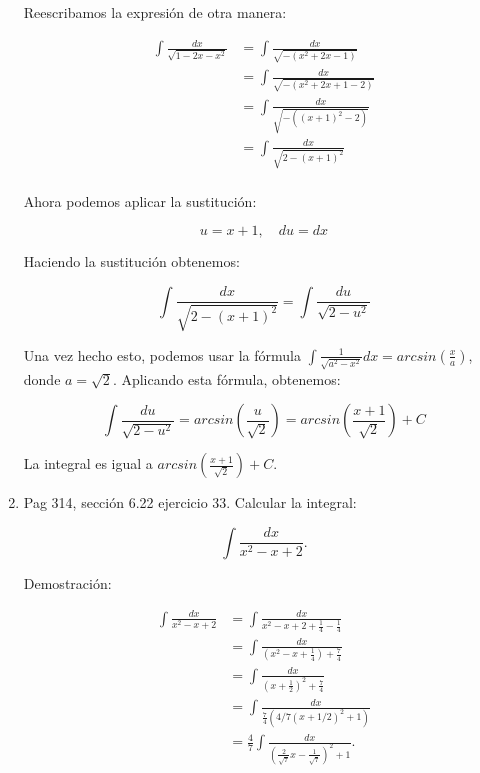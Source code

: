 \documentclass{report}
\begin{document}
\begin{enumerate}
        Reescribamos la expresión de otra manera:
        
        \begin{align*}
        \int\frac{dx}{\sqrt{1-2x-x^2}} &= \int\frac{dx}{\sqrt{-\left(x^2+2x-1\right)}} \\
        &= \int\frac{dx}{\sqrt{-\left(x^2+2x+1-2\right)}} \\
        &= \int\frac{dx}{\sqrt{-\left(\left(x+1\right)^2-2\right)}} \\
        &= \int\frac{dx}{\sqrt{2-\left(x+1\right)^2}} \\
        \end{align*}
        
        Ahora podemos aplicar la sustitución:
        
        \[ u=x+1, \quad du=dx \]
        
        Haciendo la sustitución obtenemos:
        
        \[ \int\frac{dx}{\sqrt{2-\left(x+1\right)^2}} = \int\frac{du}{\sqrt{2-u^2}} \]
        
        Una vez hecho esto, podemos usar la fórmula $\int{\frac{1}{\sqrt{a^2-x^2}}dx} = arcsin{\left(\frac{x}{a}\right)}$, donde $a=\sqrt{2}$. Aplicando esta fórmula, obtenemos:
        
        \[ \int\frac{du}{\sqrt{2-u^2}} = arcsin{\left(\frac{u}{\sqrt{2}}\right)} = arcsin{\left(\frac{x+1}{\sqrt{2}}\right)} + C \]
        
        La integral es igual a $arcsin{\left(\frac{x+1}{\sqrt{2}}\right)} + C$.
        
        \item Pag 314, sección 6.22 ejercicio 33. Calcular la integral:
        
        \[
        \int \frac{dx}{x^{2}-x+2}.
        \]
        
        Demostración:
        
        \[
        \begin{align*}
        \int \frac{dx}{x^2-x+2} &= \int \frac{dx}{x^2-x+2+\frac{1}{4}-\frac{1}{4}} \\
        &= \int \frac{dx}{\left(x^2-x+\frac{1}{4}\right)+\frac{7}{4}} \\
        &= \int \frac{dx}{\left(x+\frac{1}{2}\right)^2+\frac{7}{4}} \\
        &= \int \frac{dx}{\frac{7}{4}\left(4/7(x+1/2)^2+1\right)} \\
        &= \frac{4}{7} \int \frac{dx}{\left(\frac{2}{\sqrt{7}} x-\frac{1}{\sqrt{7}}\right)^2+1}.
        \end{align*}
        \]
        

\end{enumerate}
\end{document}
